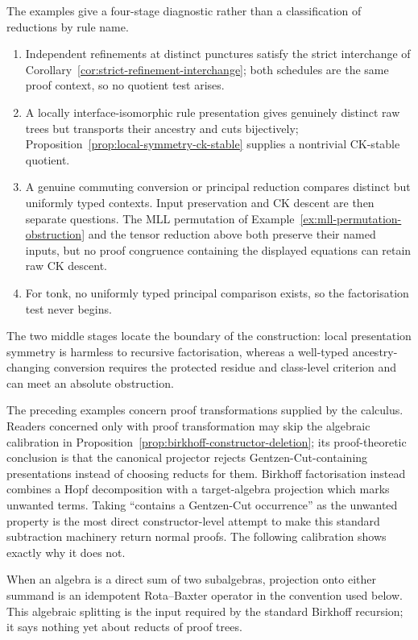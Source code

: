 \documentclass[10pt,a4paper]{article}
\theoremstyle{plain}
\theoremstyle{definition}
\theoremstyle{remark}
\begin{document}
The examples give a four-stage diagnostic rather than a classification
of reductions by rule name.
\begin{enumerate}[label=(\roman*)]
\item Independent refinements at distinct punctures satisfy the strict
interchange of Corollary~\ref{cor:strict-refinement-interchange}; both
schedules are the same proof context, so no quotient test arises.
\item A locally interface-isomorphic rule presentation gives genuinely
distinct raw trees but transports their ancestry and cuts bijectively;
Proposition~\ref{prop:local-symmetry-ck-stable} supplies a nontrivial
CK-stable quotient.
\item A genuine commuting conversion or principal reduction compares
distinct but uniformly typed contexts.  Input preservation and CK descent
are then separate questions.  The MLL permutation of
Example~\ref{ex:mll-permutation-obstruction} and the tensor reduction
above both preserve their named inputs, but no proof congruence containing
the displayed equations can retain raw CK descent.
\item For \(\mathbin{\mathrm{tonk}}\), no uniformly typed principal
comparison exists, so the factorisation test never begins.
\end{enumerate}
The two middle stages locate the boundary of the construction: local
presentation symmetry is harmless to recursive factorisation, whereas a
well-typed ancestry-changing conversion requires the protected residue and
class-level criterion and can meet an absolute obstruction.

The preceding examples concern proof transformations supplied by the
calculus.  Readers concerned only with proof transformation may skip the
algebraic calibration in Proposition~\ref{prop:birkhoff-constructor-deletion};
its proof-theoretic conclusion is that the canonical projector rejects
Gentzen-Cut-containing presentations instead of choosing reducts for them.
Birkhoff factorisation instead combines a Hopf decomposition
with a target-algebra projection which marks unwanted terms.  Taking
``contains a Gentzen-Cut occurrence'' as the unwanted property is the
most direct constructor-level attempt to make this standard subtraction
machinery return normal proofs.  The following calibration shows exactly
why it does not.

When an algebra is a direct sum of two subalgebras, projection onto either
summand is an idempotent Rota--Baxter operator in the convention used
below.  This algebraic splitting is the input required by the standard
Birkhoff recursion; it says nothing yet about reducts of proof trees.
\end{document}
